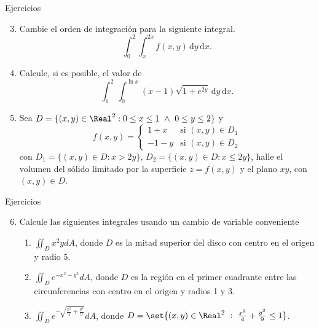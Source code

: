 \begin{frame}{Ejercicios}
  \vspace{-5mm}
  \begin{enumerate}
    \setcounter{enumi}{2}
    \item Cambie el orden de integración para la siguiente integral.
    $$\int_0^2\int_{x}^{2x}f(x,y)\,\mathrm{d}y\,\mathrm{d}x. $$
    \item  Calcule, si es posible, el valor de
    \vspace{-1mm}
    $$\int_{1}^2\, \int_0^{\ln x}(x-1)\sqrt{1+e^{2y}}\,\mathrm{d}y\,\mathrm{d}x.$$
    \item Sea $D=\{(x,y)\in\Real^2: 0\leq x\leq 1\,\,\wedge\,\, 0\leq y\leq 2\}$ y %
    $$f(x,y)=\begin{cases}
      1+x  & \text{si } (x,y)\in D_1\\
      -1-y & \text{si } (x,y)\in D_2
    \end{cases}$$
    con $D_1=\{(x,y)\in D: x>2y\}$, $D_2=\{(x,y)\in D: x\leq 2y\}$, halle el volumen del sólido limitado por la superficie $z=f(x,y)$ y el plano $xy$, con $(x,y)\in D$.
  \end{enumerate}
\end{frame}

\begin{frame}{Ejercicios}
  \begin{enumerate}
    \setcounter{enumi}{5}
    \item Calcule las siguientes integrales usando un cambio de variable conveniente
      \begin{enumerate}
        \item $\displaystyle\iint_{D} x^2y dA$, donde $D$ es la mitad superior del disco  con centro en el origen y radio 5.
        \item $\displaystyle\iint_{D} e^{-x^2-y^2} dA$, donde $D$ es la región en el primer cuadrante entre las circunferencias con centro en el origen y radios 1 y 3.
        \item $\displaystyle\iint_{D} e^{-\sqrt{\frac{x^2}{4}+\frac{y^2}{9}}} dA$, donde $D=\set{(x,y)\in\Real^2\ :\ \frac{x^2}{4}+\frac{y^2}{9}\leq 1}$.
      \end{enumerate}
  \end{enumerate}
\end{frame}

